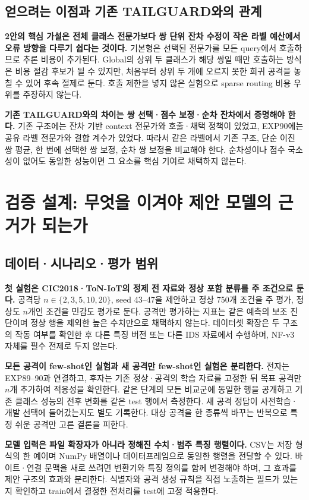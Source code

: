 \subsection{얻으려는 이점과 기존 TAILGUARD와의 관계}
\textbf{2안의 핵심 가설은 전체 클래스 전문가보다 쌍 단위 잔차 수정이 작은 라벨 예산에서 오류 방향을 다루기 쉽다는 것이다.} 기본형은 선택된 전문가를 모든 query에서 호출하므로 추론 비용이 추가된다. Global의 상위 두 클래스가 해당 쌍일 때만 호출하는 방식은 비용 절감 후보가 될 수 있지만, 처음부터 상위 두 개에 오르지 못한 희귀 공격을 놓칠 수 있어 후속 절제로 둔다. 호출 제한을 넣지 않은 실험으로 sparse routing 비용 우위를 주장하지 않는다.

\textbf{기존 TAILGUARD와의 차이는 쌍 선택·점수 보정·순차 잔차에서 증명해야 한다.} 기존 구조에는 잔차 기반 context 전문가와 호출·채택 정책이 있었고, EXP90에는 공유 라벨 전문가와 결합 계수가 있었다. 따라서 같은 라벨에서 기존 구조, 단순 이진 쌍 평균, 한 번에 선택한 쌍 보정, 순차 쌍 보정을 비교해야 한다. 순차성이나 점수 국소성이 없어도 동일한 성능이면 그 요소를 핵심 기여로 채택하지 않는다.

\section{검증 설계: 무엇을 이겨야 제안 모델의 근거가 되는가}
\subsection{데이터·시나리오·평가 범위}
\textbf{첫 실험은 CIC2018·ToN-IoT의 정제 전 자료와 정상 포함 분류를 주 조건으로 둔다.} 공격당 $n\in\{2,3,5,10,20\}$, seed 43--47을 제안하고 정상 750개 조건을 주 평가, 정상도 $n$개인 조건을 민감도 평가로 둔다. 공격만 평가하는 지표는 같은 예측의 보조 진단이며 정상 행을 제외한 높은 수치만으로 채택하지 않는다. 데이터셋 확장은 두 구조의 작동 여부를 확인한 후 다른 특징 버전 또는 다른 IDS 자료에서 수행하며, NF-v3 자체를 필수 전제로 두지 않는다.

\textbf{모든 공격이 few-shot인 실험과 새 공격만 few-shot인 실험은 분리한다.} 전자는 EXP89--90과 연결하고, 후자는 기존 정상·공격의 학습 자료를 고정한 뒤 목표 공격만 $n$개 추가하여 적응성을 확인한다. 같은 단계의 모든 비교군에 동일한 행을 공개하고 기존 클래스 성능의 전후 변화를 같은 test 행에서 측정한다. 새 공격 정답이 사전학습·개발 선택에 들어갔는지도 별도 기록한다. 대상 공격을 한 종류씩 바꾸는 반복으로 특정 쉬운 공격만 고른 결론을 피한다.

\textbf{모델 입력은 파일 확장자가 아니라 정해진 수치·범주 특징 행렬이다.} CSV는 저장 형식의 한 예이며 NumPy 배열이나 데이터프레임으로 동일한 행렬을 전달할 수 있다. 바이트·연결 문맥을 새로 쓰려면 변환기와 특징 정의를 함께 변경해야 하며, 그 효과를 제안 구조의 효과와 분리한다. 식별자와 공격 생성 규칙을 직접 노출하는 필드가 있는지 확인하고 train에서 결정한 전처리를 test에 고정 적용한다.

